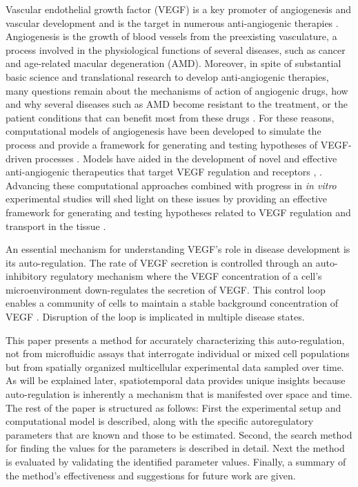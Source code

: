  Vascular endothelial growth factor (VEGF) is a key promoter of angiogenesis and vascular development and is the target in numerous anti-angiogenic therapies \cite{Carmeliet2000Angiogenesis}. Angiogenesis is the growth of blood vessels from the preexisting vasculature, a process involved in the physiological functions of several diseases, such as cancer and age-related macular degeneration (AMD). Moreover, in spite of substantial basic science and translational research to develop anti-angiogenic therapies, many questions remain about the mechanisms of action of angiogenic drugs, how and why several diseases such as AMD become resistant to the treatment, or the patient conditions that can benefit most from these drugs \cite{Bergers2008Modes}. For these reasons, computational models of angiogenesis have been developed to simulate the process and provide a framework for generating and testing hypotheses of VEGF-driven processes \cite{qanitabaker:MacGabhann2006Computational, qanitabaker:Stefanini2008Compartment, qanitabaker:Gabhann2012Simulating}. Models have aided in the development of novel and effective anti-angiogenic therapeutics that target VEGF regulation and receptors \cite{qanitabaker:Mahoney2012Multiobjective}, \cite{qanitabaker:Finley2013Compartment,qanitabaker:Yen2011TwoCompartment}. Advancing these computational approaches combined with progress in \textit{in vitro} experimental studies will shed light on these issues by providing an effective framework for generating and testing hypotheses related to VEGF regulation and transport in the tissue \cite{qanitabaker:Stefanini2008Compartment}.

 An essential mechanism for understanding VEGF's role in disease development is its auto-regulation. The rate of VEGF secretion is controlled through an auto-inhibitory regulatory mechanism where the VEGF concentration of a cell's microenvironment down-regulates the secretion of VEGF. This control loop enables a community of cells to maintain a stable background concentration of VEGF \cite{Takahashi2005Vascular}. Disruption of the loop is implicated in multiple disease states.

 This paper presents a method for accurately characterizing this auto-regulation, not from microfluidic assays that interrogate individual or mixed cell populations but from spatially organized multicellular experimental data sampled over time. As will be explained later, spatiotemporal data provides unique insights because auto-regulation is inherently a mechanism that is manifested over space and time. The rest of the paper is structured as follows: First the experimental setup and computational model is described, along with the specific autoregulatory parameters that are known and those to be estimated. Second, the search method for finding the values for the parameters is described in detail. Next the method is evaluated by validating the identified parameter values. Finally, a summary of the method's effectiveness and suggestions for future work are given.



